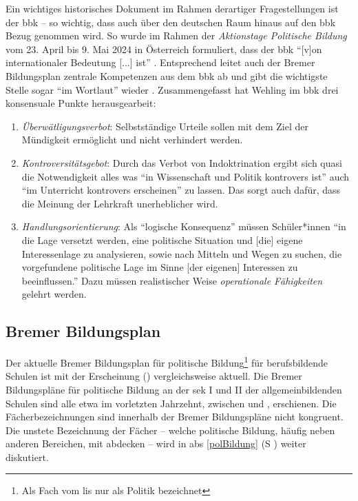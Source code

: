 Ein wichtiges historisches Dokument im Rahmen derartiger Fragestellungen ist der \Acrlong{bbk} \autocites[29]{Gesner2016}{Wehling1977} -- so wichtig, dass auch über den deutschen Raum hinaus auf den \gls{bbk} Bezug genommen wird. So wurde im Rahmen der \emph{Aktionstage Politische Bildung} vom 23. April bis 9. Mai 2024 in Österreich formuliert, dass der \gls{bbk} \enquote{[v]on internationaler Bedeutung [...] ist} \autocite{bbkÖsterreich2023}. Entsprechend leitet auch der Bremer Bildungsplan zentrale Kompetenzen aus dem \gls{bbk} ab und gibt die wichtigste Stelle sogar \enquote{im Wortlaut} wieder \autocite[11-12]{bplan}.
Zusammengefasst hat Wehling im \gls{bbk} drei konsensuale Punkte herausgearbeit:
\begin{enumerate}
    \item \emph{Überwätligungsverbot}: Selbstständige Urteile sollen mit dem Ziel der Mündigkeit ermöglicht und nicht verhindert werden. 
    \item \emph{Kontroversitätsgebot}: Durch das Verbot von Indoktrination ergibt sich quasi die Notwendigkeit alles was \enquote{in Wissenschaft und Politik kontrovers ist} auch \enquote{im Unterricht kontrovers erscheinen} zu lassen. Das sorgt auch dafür, dass die Meinung der Lehrkraft unerheblicher wird.
    \item \emph{Handlungsorientierung}: Als \enquote{logische Konsequenz} müssen Schüler*innen \enquote{in die Lage versetzt werden, eine politische Situation und [die] eigene Interessenlage zu analysieren, sowie nach Mitteln und Wegen zu suchen, die vorgefundene politische Lage im Sinne [der eigenen] Interessen zu beeinflussen.} Dazu müssen realistischer Weise \emph{operationale Fähigkeiten} gelehrt werden. 
    
    \autocite[][179-180]{Wehling1977}
\end{enumerate}



\subsection{Bremer Bildungsplan \label{bplan}} %
Der aktuelle Bremer Bildungsplan für politische Bildung\footnote{Als Fach vom \gls{lis} nur als Politik bezeichnet} für berufsbildende Schulen ist mit der Erscheinung \citeyear{bplan} (\citeauthor{bplan}) vergleichsweise aktuell. Die Bremer Bildungspläne für politische Bildung an der \gls{sek} I und II der allgemeinbildenden Schulen sind alle etwa im vorletzten Jahrzehnt, zwischen \citeyear{vogel2006gy} \autocites{vogel2006gs, vogel2006gy, lower2008} und \citeyear{vogel2010gp} \autocite{vogel2010gp}, erschienen. Die Fächerbezeichnungen sind innerhalb der Bremer Bildungspläne nicht kongruent. Die unstete Bezeichnung der Fächer -- welche politische Bildung, häufig neben anderen Bereichen, mit abdecken -- wird in \gls{abs} \ref{polBildung} (\gls{S} \pageref{polBildung}) weiter diskutiert.

